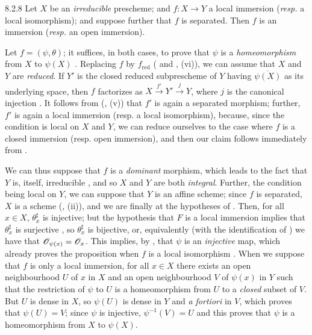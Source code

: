 \begin{envs}[Proposition]{8.2.8}
\label{prop-1.8.2.8}
Let $X$ be an \emph{irreducible} prescheme; and
$f:X\to Y$ a local immersion (\emph{resp.} a local isomorphism); and
suppose further that $f$ is separated. Then $f$ is an immersion (\emph{resp.}
an open immersion).
\end{envs}

Let $f=(\psi,\theta)$; it suffices, in both cases, to prove that $\psi$ is a
\emph{homeomorphism} from $X$ to $\psi(X)$ . Replacing $f$ by
$f_\mathrm{red}$ ( and , (vi)), we can assume that $X$
and $Y$ are \emph{reduced}. If $Y'$ is the closed reduced subprescheme of $Y$
having $\overline{\psi(X)}$ as its underlying space, then $f$ factorizes as
$X\xrightarrow{f'}Y'\xrightarrow{j}Y$, where $j$ is the canonical injection
. It follows from (, (v)) that $f'$ is again a
separated morphism; further, $f'$ is again
a local immersion (resp. a local isomorphism), because, since the condition is local on $X$
and $Y$, we can reduce ourselves to the case where $f$ is a closed immersion (resp. open
immersion), and then our claim follows immediately from .

We can thus suppose that $f$ is a \emph{dominant} morphism, which leads to the
fact that $Y$ is, itself, irreducible , and so $X$ and $Y$
are both \emph{integral}. Further, the condition being local on $Y$, we can
suppose that $Y$ is an affine scheme; since $f$ is separated, $X$ is a scheme
(, (ii)), and we are finally at the hypotheses of .
Then, for all $x\in X$, $\theta_x^\sharp$ is injective; but the hypothesis that $F$
is a local immersion implies that $\theta_x^\sharp$ is surjective , so
$\theta_x^\sharp$ is bijective, or, equivalently (with the identification of
) we have that $\mathscr{O}_{\psi(x)}=\mathscr{O}_x$. This implies, by ,
that $\psi$ is an \emph{injective} map, which already proves the proposition
when $f$ is a local isomorphism . When we suppose that $f$ is only
a local immersion, for all $x\in X$ there exists an open neighbourhood $U$ of
$x$ in $X$ and an open neighbourhood $V$ of $\psi(x)$ in $Y$ such that the
restriction of $\psi$ to $U$ is a homeomorphism from $U$ to a \emph{closed}
subset of $V$. But $U$ is dense in $X$, so $\psi(U)$ is dense in $Y$ and
\emph{a fortiori} in $V$, which proves that $\psi(U)=V$; since $\psi$ is
injective, $\psi^{-1}(V)=U$ and this proves that $\psi$ is a homeomorphism from
$X$ to $\psi(X)$.

